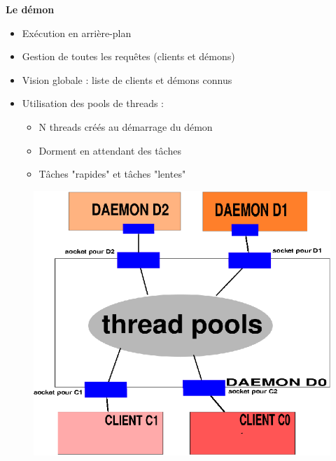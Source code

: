\documentclass{beamer}
\begin{document}
\begin{frame}
    \textbf{Le démon}
    
    \begin{itemize}
        \item Exécution en arrière-plan
        \item Gestion de toutes les requêtes (clients et démons)
        \item Vision globale : liste de clients et démons connus
        \item Utilisation des pools de threads :
            \begin{itemize}
                \item N threads créés au démarrage du démon
                \item Dorment en attendant des tâches
                \item Tâches "rapides" et tâches "lentes"
            \end{itemize}
     \end{itemize}
\begin{center}
\begin{figure}[htbp]
    \centering
    \includegraphics[scale=0.5]{archi_daemon.eps}
\end{figure}
\end{center}

\end{frame}
\end{document}
